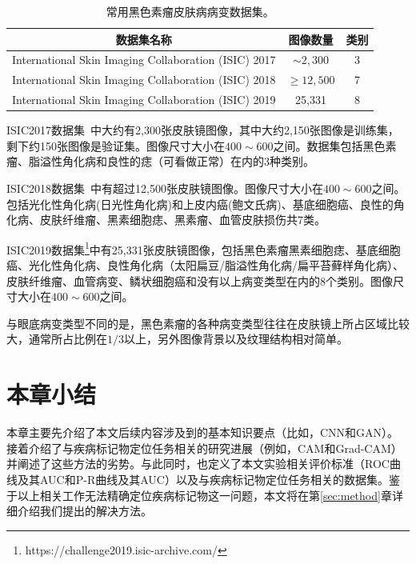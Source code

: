\begin{table}[h]
	\centering
	\caption[常用黑色素瘤皮肤病病变数据集]{常用黑色素瘤皮肤病病变数据集。}
	\label{tab:skin_datasets_info}
	\begin{tabular}{c|c|c}
		\toprule[2pt]
		数据集名称 & 图像数量 & 类别 \\
		\midrule[2pt]
		International Skin Imaging Collaboration (ISIC) 2017 &  $\sim 2,300$ & 3  \\ \hline
		International Skin Imaging Collaboration (ISIC) 2018 & $\geq 12,500$ & 7  \\ \hline
		International Skin Imaging Collaboration (ISIC) 2019 & 25,331 & 8    \\ 
		\bottomrule[2pt]
	\end{tabular}
\end{table}

ISIC2017数据集~\cite{codella2018skin}中大约有2,300张皮肤镜图像，其中大约2,150张图像是训练集，剩下约150张图像是验证集。图像尺寸大小在$400\sim 600$之间。数据集包括黑色素瘤、脂溢性角化病和良性的痣（可看做正常）在内的3种类别。

ISIC2018数据集~\cite{codella2019skin, tschandl2018ham10000}中有超过12,500张皮肤镜图像。图像尺寸大小在$400\sim 600$之间。包括光化性角化病(日光性角化病)和上皮内癌(鲍文氏病)、基底细胞癌、良性的角化病、皮肤纤维瘤、黑素细胞痣、黑素瘤、血管皮肤损伤共7类。

ISIC2019数据集\footnote{https://challenge2019.isic-archive.com/}中有25,331张皮肤镜图像，包括黑色素瘤黑素细胞痣、基底细胞癌、光化性角化病、良性角化病（太阳扁豆/脂溢性角化病/扁平苔藓样角化病）、皮肤纤维瘤、血管病变、鳞状细胞癌和没有以上病变类型在内的8个类别。图像尺寸大小在$400\sim 600$之间。

与眼底病变类型不同的是，黑色素瘤的各种病变类型往往在皮肤镜上所占区域比较大，通常所占比例在$1/3$以上，另外图像背景以及纹理结构相对简单。


\section{本章小结}
本章主要先介绍了本文后续内容涉及到的基本知识要点（比如，CNN和GAN）。接着介绍了与疾病标记物定位任务相关的研究进展（例如，CAM和Grad-CAM）并阐述了这些方法的劣势。与此同时，也定义了本文实验相关评价标准（ROC曲线及其AUC和P-R曲线及其AUC）以及与疾病标记物定位任务相关的数据集。鉴于以上相关工作无法精确定位疾病标记物这一问题，本文将在第\ref{sec:method}章详细介绍我们提出的解决方法。

